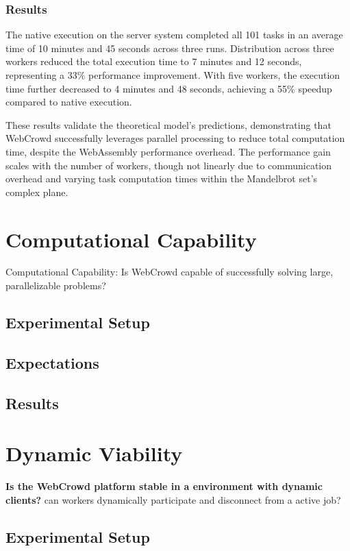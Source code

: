 \subsubsection{Results}
The native execution on the server system completed all 101 tasks in an average time of 10 minutes and 45 seconds across three runs. Distribution across three workers reduced the total execution time to 7 minutes and 12 seconds, representing a 33\% performance improvement. With five workers, the execution time further decreased to 4 minutes and 48 seconds, achieving a 55\% speedup compared to native execution.

These results validate the theoretical model's predictions, demonstrating that WebCrowd successfully leverages parallel processing to reduce total computation time, despite the WebAssembly performance overhead. The performance gain scales with the number of workers, though not linearly due to communication overhead and varying task computation times within the Mandelbrot set's complex plane.

\section{Computational Capability}
\label{sec:evaluation:computation}
Computational Capability: Is WebCrowd capable of successfully solving large, parallelizable problems?

\subsection{Experimental Setup}

\subsection{Expectations}

\subsection{Results}

\section{Dynamic Viability}
\label{sec:evaluation:dynamic}
\textbf{Is the WebCrowd platform stable in a environment with dynamic clients?}
\newline
can workers dynamically participate and disconnect from a active job?

\subsection{Experimental Setup}

